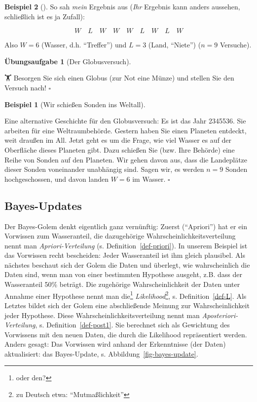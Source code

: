 \documentclass[
  ngerman,
  letterpaper,
  twoside,
  open=any]{scrbook}
\theoremstyle{definition}
\newtheorem{example}{Beispiel}[chapter]
\theoremstyle{plain}
\theoremstyle{definition}
\newtheorem{exercise}{Übungsaufgabe}[chapter]
\theoremstyle{definition}
\theoremstyle{remark}
\begin{document}
\begin{example}[]
So sah \emph{mein} Ergebnis aus (\emph{Ihr} Ergebnis kann anders
aussehen, schließlich ist es ja Zufall):

\[W \quad L \quad W \quad W \quad W \quad L \quad W \quad L \quad W\]

Also \(W=6\) (Wasser, d.h. \enquote{Treffer}) und \(L=3\) (Land,
\enquote{Niete}) (\(n=9\) Versuche).

\begin{exercise}[Der
Globusversuch]\protect\hypertarget{exr-globe1}{}\label{exr-globe1}

🏋️️ Besorgen Sie sich einen Globus (zur Not eine Münze) und stellen Sie
den Versuch nach! \(\square\)

\end{exercise}

\begin{example}[Wir schießen Sonden ins
Weltall]\protect\hypertarget{exm-sonde-im-all}{}\label{exm-sonde-im-all}

Eine alternative Geschichte für den Globusversuch: Es ist das Jahr
2345536. Sie arbeiten für eine Weltraumbehörde. Gestern haben Sie einen
Planeten entdeckt, weit draußen im All. Jetzt geht es um die Frage, wie
viel Wasser es auf der Oberfläche dieses Planeten gibt. Dazu schießen
Sie (bzw. Ihre Behörde) eine Reihe von Sonden auf den Planeten. Wir
gehen davon aus, dass die Landeplätze dieser Sonden voneinander
unabhängig sind. Sagen wir, es werden \(n=9\) Sonden hochgeschossen, und
davon landen \(W=6\) im Wasser. \(\square\)

\end{example}

\subsection{Bayes-Updates}\label{bayes-updates}

Der Bayes-Golem denkt eigentlich ganz vernünftig: Zuerst
(\enquote{Apriori}) hat er ein Vorwissen zum Wasseranteil, die
dazugehörige Wahrscheinlichkeitsverteilung nennt man
\emph{Apriori-Verteilung} (s. Definition~\ref{def-priori}). In unserem
Beispiel ist das Vorwissen recht bescheiden: Jeder Wasseranteil ist ihm
gleich plausibel. Als nächstes beschaut sich der Golem die Daten und
überlegt, wie wahrscheinlich die Daten sind, wenn man von einer
bestimmten Hypothese ausgeht, z.B. dass der Wasseranteil 50\% beträgt.
Die zugehörige Wahrscheinlichkeit der Daten unter Annahme einer
Hypothese nennt man die\footnote{oder den?}
\emph{Likelihood}\footnote{zu Deutsch etwa: \enquote{Mutmaßlichkeit}},
s. Definition~\ref{def-L}. Als Letztes bildet sich der Golem eine
abschließende Meinung zur Wahrscheinlichkeit jeder Hypothese. Diese
Wahrscheinlichkeitsverteilung nennt man \emph{Aposteriori-Verteilung},
s. Definition~\ref{def-post1}. Sie berechnet sich als Gewichtung des
Vorwissens mit den neuen Daten, die durch die Likelihood repräsentiert
werden. Anders gesagt: Das Vorwissen wird anhand der Erkenntnisse (der
Daten) aktualisiert: das Bayes-Update, s.
Abbildung~\ref{fig-bayes-update}.


\end{example}
\end{document}
